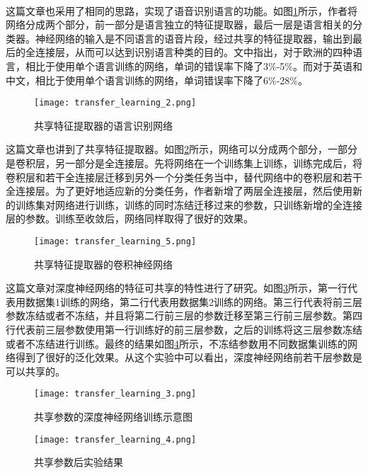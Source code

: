 \paragraph{}这篇文章\cite{6639081}也采用了相同的思路，实现了语音识别语言的功能。如图\ref{fig:transfer_learning_2}所示，作者将网络分成两个部分，前一部分是语言独立的特征提取器，最后一层是语言相关的分类器。神经网络的输入是不同语言的语音片段，经过共享的特征提取器，输出到最后的全连接层，从而可以达到识别语言种类的目的。文中指出，对于欧洲的四种语言，相比于使用单个语言训练的网络，单词的错误率下降了3\%-5\%。而对于英语和中文，相比于使用单个语言训练的网络，单词错误率下降了6\%-28\%。
\begin{figure}
    \centering
    \texttt{[image: transfer\_learning\_2.png]}
    \caption{共享特征提取器的语言识别网络}
    \label{fig:transfer_learning_2}
\end{figure}
这篇文章\cite{Oquab_2014_CVPR}也讲到了共享特征提取器。如图\ref{fig:transfer_learning_5}所示，网络可以分成两个部分，一部分是卷积层，另一部分是全连接层。先将网络在一个训练集上训练，训练完成后，将卷积层和若干全连接层迁移到另外一个分类任务当中，替代网络中的卷积层和若干全连接层。为了更好地适应新的分类任务，作者新增了两层全连接层，然后使用新的训练集对网络进行训练，训练的同时冻结迁移过来的参数，只训练新增的全连接层的参数。训练至收敛后，网络同样取得了很好的效果。 
\begin{figure}
    \centering
    \texttt{[image: transfer\_learning\_5.png]}
    \caption{共享特征提取器的卷积神经网络}
    \label{fig:transfer_learning_5}
\end{figure}
这篇文章\cite{yosinski_2014_NIPS}对深度神经网络的特征可共享的特性进行了研究。如图\ref{fig:transfer_learning_3}所示，第一行代表用数据集1训练的网络，第二行代表用数据集2训练的网络。第三行代表将前三层参数冻结或者不冻结，并且将第二行前三层的参数迁移至第三行前三层参数。第四行代表前三层参数使用第一行训练好的前三层参数，之后的训练将这三层参数冻结或者不冻结进行训练。最终的结果如图\ref{fig:transfer_learning_4}所示，不冻结参数用不同数据集训练的网络得到了很好的泛化效果。从这个实验中可以看出，深度神经网络前若干层参数是可以共享的。
\begin{figure}
    \centering
    \texttt{[image: transfer\_learning\_3.png]}
    \caption{共享参数的深度神经网络训练示意图}
    \label{fig:transfer_learning_3}
\end{figure}
\begin{figure}
    \centering
    \texttt{[image: transfer\_learning\_4.png]}
    \caption{共享参数后实验结果}
    \label{fig:transfer_learning_4}
\end{figure}

